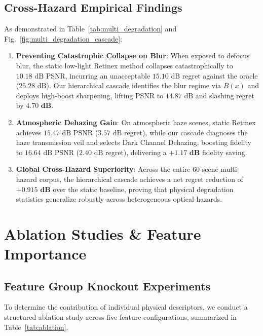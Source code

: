 \documentclass[journal]{IEEEtran}
\begin{document}
\subsection{Cross-Hazard Empirical Findings}
As demonstrated in Table~\ref{tab:multi_degradation} and Fig.~\ref{fig:multi_degradation_cascade}:
\begin{enumerate}
    \item \textbf{Preventing Catastrophic Collapse on Blur}: When exposed to defocus blur, the static low-light Retinex method collapses catastrophically to $10.18\text{ dB}$ PSNR, incurring an unacceptable $15.10\text{ dB}$ regret against the oracle ($25.28\text{ dB}$). Our hierarchical cascade identifies the blur regime via $B(x)$ and deploys high-boost sharpening, lifting PSNR to $14.87\text{ dB}$ and slashing regret by $\mathbf{4.70\text{ dB}}$.
    \item \textbf{Atmospheric Dehazing Gain}: On atmospheric haze scenes, static Retinex achieves $15.47\text{ dB}$ PSNR ($3.57\text{ dB}$ regret), while our cascade diagnoses the haze transmission veil and selects Dark Channel Dehazing, boosting fidelity to $16.64\text{ dB}$ PSNR ($2.40\text{ dB}$ regret), delivering a $\mathbf{+1.17\text{ dB}}$ fidelity saving.
    \item \textbf{Global Cross-Hazard Superiority}: Across the entire 60-scene multi-hazard corpus, the hierarchical cascade achieves a net regret reduction of $\mathbf{+0.915\text{ dB}}$ over the static baseline, proving that physical degradation statistics generalize robustly across heterogeneous optical hazards.
\end{enumerate}

\section{Ablation Studies \& Feature Importance}

\subsection{Feature Group Knockout Experiments}
To determine the contribution of individual physical descriptors, we conduct a structured ablation study across five feature configurations, summarized in Table~\ref{tab:ablation}.
\end{document}
